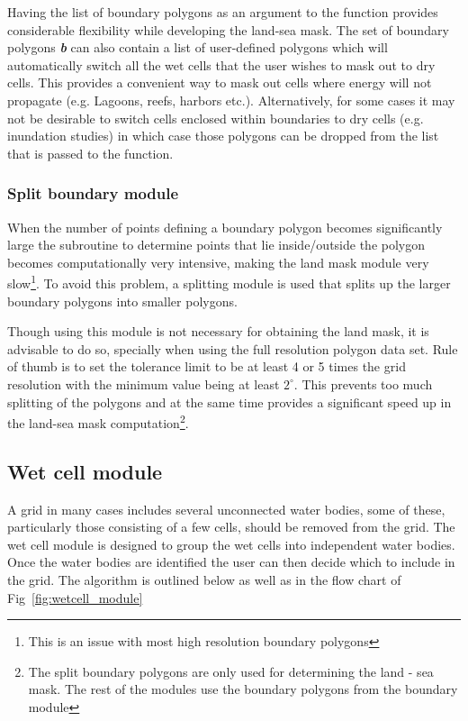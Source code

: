 \documentclass[12pt]{article}
\newcommand{\degree}{^{\circ}}
\begin{document}
Having the list of boundary polygons as an argument to the function provides considerable flexibility while developing the land-sea mask. The set of boundary polygons \textbf{\textit{b}} can also contain a list of user-defined polygons which will automatically switch all the wet cells that the user wishes to mask out to dry cells. This provides a convenient way to mask out cells where energy will not propagate (e.g. Lagoons, reefs, harbors etc.). Alternatively, for some cases it may not be desirable to switch cells enclosed within boundaries to dry cells (e.g. inundation studies) in which case those polygons can be dropped from the list that is passed to the function.

\subsubsection{Split boundary module}

When the number of points defining a boundary polygon becomes significantly large the subroutine to determine points that lie inside/outside the polygon becomes computationally very intensive, making the land mask module very slow\footnote{This is an issue with most high resolution boundary polygons}. To avoid this problem, a splitting module is used that splits up the larger boundary polygons into smaller polygons. 

Though using this module is not necessary for obtaining the land mask, it is advisable to do so, specially when using the full resolution polygon data set. Rule of thumb is to set the tolerance limit to be at least 4 or 5 times the grid resolution with the minimum value being at least $2\degree$. This prevents too much splitting of the polygons and at the same time provides a significant speed up in the land-sea mask computation\footnote{The split boundary polygons are only used for determining the land - sea mask. The rest of the modules use the boundary polygons from the boundary module}.

\subsection{Wet cell module}
\label{sc:wet_cell}
A grid in many cases includes several unconnected water bodies, some of these, particularly those consisting of a few cells, should be removed from the grid. The wet cell module is designed to group the wet cells into independent water bodies. Once the water bodies are identified the user can then decide which to include in the grid. The algorithm is outlined below as well as in the flow chart of Fig~\ref{fig:wetcell_module}
\end{document}
